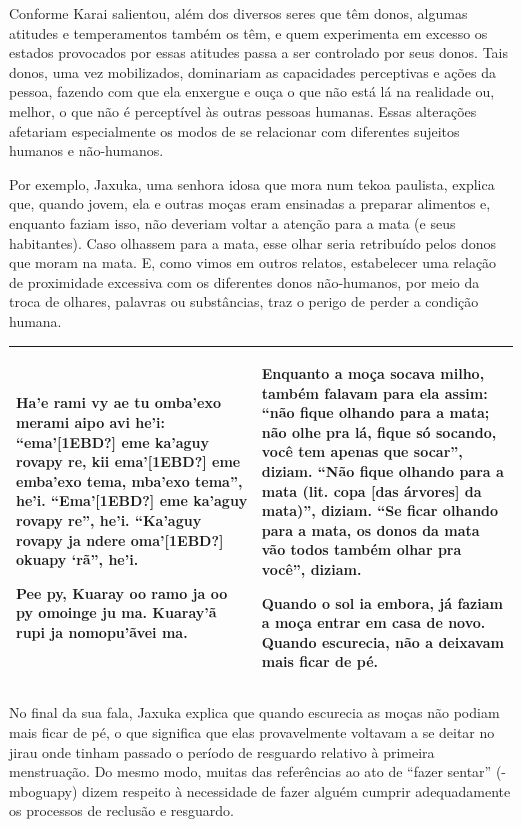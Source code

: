 Conforme Karai salientou, além dos diversos seres que têm donos, algumas
atitudes e temperamentos também os têm, e quem experimenta em excesso
os estados provocados por essas atitudes passa a ser controlado por
seus donos. Tais donos, uma vez mobilizados, dominariam as capacidades
perceptivas e ações da pessoa, fazendo com que ela enxergue e ouça o
que não está lá na realidade ou, melhor, o que não é perceptível às
outras pessoas humanas. Essas alterações afetariam especialmente os
modos de se relacionar com diferentes sujeitos humanos e não-humanos.

Por exemplo, Jaxuka, uma senhora idosa que mora num tekoa paulista,
explica que, quando jovem, ela e outras moças eram ensinadas a preparar
alimentos e, enquanto faziam isso, não deveriam voltar a atenção para a
mata (e seus habitantes). Caso olhassem para a mata, esse olhar seria
retribuído pelos donos que moram na mata. E, como vimos em outros
relatos, estabelecer uma relação de proximidade excessiva com os
diferentes donos não-humanos, por meio da troca de olhares, palavras ou
substâncias, traz o perigo de perder a condição humana.  

\begin{flushleft}
\tablehead{}
\begin{supertabular}{m{2.88166in}|m{2.87476in}}
Ha’e rami vy ae tu omba’exo merami aipo avi he’i: ``ema’[1EBD?] eme
ka’aguy rovapy re, kii ema’[1EBD?] eme emba’exo tema, mba’exo tema'',
he’i. ``Ema’[1EBD?] eme ka’aguy rovapy re'', he’i. ``Ka’aguy rovapy ja
ndere oma’[1EBD?] okuapy ‘rã'', he’i. 

Pee py, Kuaray oo ramo ja oo py omoinge ju ma. Kuaray’ã rupi ja
nomopu’ãvei ma. 

 &
Enquanto a moça socava milho, também falavam para ela assim: ``não fique
olhando para a mata; não olhe pra lá, fique só socando, você tem apenas
que socar'', diziam. ``Não fique olhando para a mata (lit. copa [das
árvores] da mata)'', diziam. ``Se ficar olhando para a mata, os donos da
mata vão todos também olhar pra você'', diziam. 

Quando o sol ia embora, já faziam a moça entrar em casa de novo. Quando
escurecia, não a deixavam mais ficar de pé.\\\hline
\end{supertabular}
\end{flushleft}
No final da sua fala, Jaxuka explica que quando escurecia as moças não
podiam mais ficar de pé, o que significa que elas provavelmente
voltavam a se deitar no jirau onde tinham passado o período de
resguardo relativo à primeira menstruação. Do mesmo modo, muitas das
referências ao ato de ``fazer sentar'' (-mboguapy) dizem respeito à
necessidade de fazer alguém cumprir adequadamente os processos de
reclusão e resguardo. 

